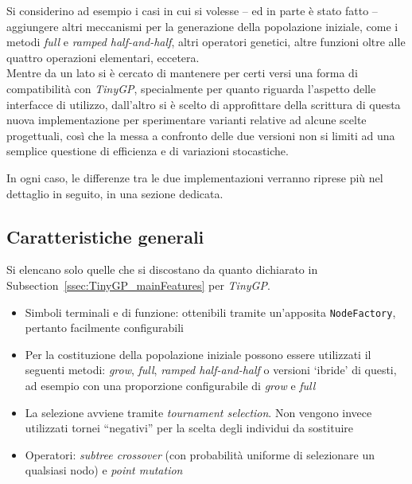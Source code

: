 \documentclass{../llncs}
\newcommand{\xss}[1]{\subsectionname~\ref{ssec:#1}}
\newcommand{\subsectionname}{Subsection}
\begin{document}
Si considerino ad esempio i casi in cui si volesse -- ed in parte è stato fatto -- aggiungere altri meccanismi per la generazione della popolazione iniziale, come i metodi \emph{full} e \emph{ramped half-and-half}, altri operatori genetici, altre funzioni oltre alle quattro operazioni elementari, eccetera.\\

Mentre da un lato si è cercato di mantenere per certi versi una forma di compatibilità con \emph{TinyGP}, specialmente per quanto riguarda l'aspetto delle interfacce di utilizzo, dall'altro si è scelto di approfittare della scrittura di questa nuova implementazione per sperimentare varianti relative ad alcune scelte progettuali, così che la messa a confronto delle due versioni non si limiti ad una semplice questione di efficienza e di variazioni stocastiche.

In ogni caso, le differenze tra le due implementazioni verranno riprese più nel dettaglio in seguito, in una sezione dedicata.

\subsection{Caratteristiche generali}
Si elencano solo quelle che si discostano da quanto dichiarato in \xss{TinyGP_mainFeatures} per \emph{TinyGP}.
\begin{itemize}
\item Simboli terminali e di funzione: ottenibili tramite un'apposita \texttt{NodeFactory}, pertanto facilmente configurabili
\item Per la costituzione della popolazione iniziale possono essere utilizzati il seguenti metodi: \emph{grow}, \emph{full}, \emph{ramped half-and-half} o versioni `ibride' di questi, ad esempio con una proporzione configurabile di \emph{grow} e \emph{full}
\item La selezione avviene tramite \emph{tournament selection}. Non vengono invece utilizzati tornei ``negativi'' per la scelta degli individui da sostituire

\item Operatori: \emph{subtree crossover} (con probabilità uniforme di selezionare un qualsiasi nodo) e \emph{point mutation}
\end{itemize}
\end{document}
